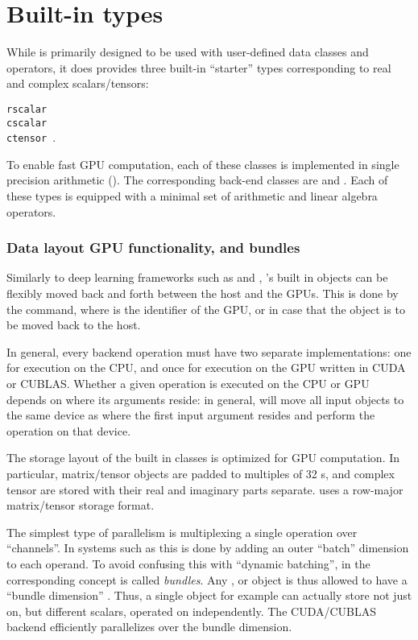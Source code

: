 \section*{Built-in types}

While \Cengine{} is primarily designed to be used with user-defined data classes and operators, 
it does provides three built-in ``starter'' types corresponding to real and complex scalars/tensors: 

\texttt{\phantom{MM}rscalar\\\phantom{MM}cscalar\\\phantom{MM}ctensor
}.

To enable fast GPU computation, each of these classes is implemented in single precision arithmetic (). 
The corresponding back-end classes are  and . 
Each of these types is equipped with a minimal set of arithmetic and linear algebra operators. 


\subsubsection*{Data layout GPU functionality, and bundles}

Similarly to deep learning frameworks such as  and , \Cengine{}'s built in 
objects can be flexibly moved back and forth between the host and the GPUs. 
This is done by the  command, where  is the identifier of the GPU, or 
 in case that the object is to be moved back to the host. 

In general, every backend operation must have two separate implementations: 
one for execution on the CPU, %
and once for execution on the GPU written in CUDA or CUBLAS. 
Whether a given operation is executed on the CPU or GPU depends on where its arguments reside: in general, 
\Cengine{} will move all input objects to the same device as where the first input argument resides 
and perform the operation on that device.

The storage layout of the built in classes is optimized for GPU computation. In particular, 
matrix/tensor objects are padded to multiples of 32 s, and complex tensor are stored 
with their real and imaginary parts separate. \Cengine{} uses a row-major matrix/tensor storage format.   

The simplest type of parallelism is multiplexing a single operation over  ``channels''. 
In systems such as  this is done by adding an outer ``batch'' dimension to each  
operand. To avoid confusing this with ``dynamic batching'', in \Cengine{} the corresponding concept is 
called \emph{bundles}. Any ,  or  object is thus 
allowed to have a ``bundle dimension'' . Thus, a single 
 object for example can actually store not just on, but  different 
scalars, operated on independently. The CUDA/CUBLAS backend efficiently parallelizes over the bundle dimension. 